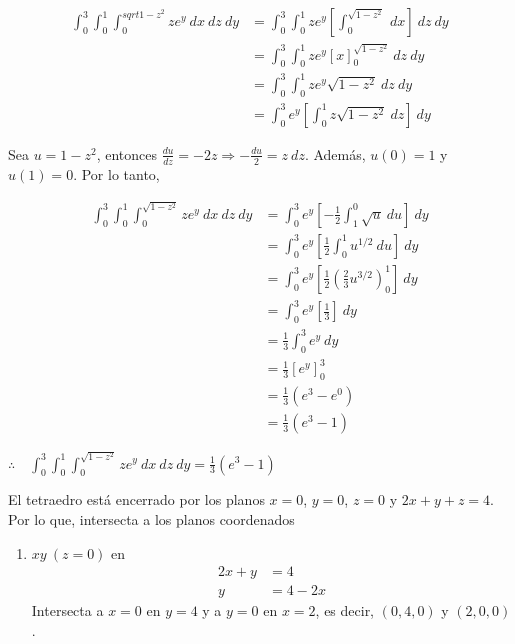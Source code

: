 \documentclass[12pt]{exam}
\begin{document}
\begin{questions}
\begin{enumerate}[(a)]
    \begin{align*}
      \int_0^3 \int_0^1 \int_0^{sqrt{1-z^2}} ze^y ~ dx ~ dz ~ dy
      &= \int_0^3 \int_0^1 ze^y \left[ \int_0^{\sqrt{1-z^2}} ~ dx \right] ~ dz ~ dy \\
      &= \int_0^3 \int_0^1 ze^y \left[ x \right]_0^{\sqrt{1-z^2}} ~ dz ~ dy \\
      &= \int_0^3 \int_0^1 ze^y \sqrt{1-z^2} ~ dz ~ dy \\
      &= \int_0^3 e^y \left[ \int_0^1 z \sqrt{1-z^2} ~ dz \right] ~ dy
    \end{align*}

    Sea $u=1-z^2$, entonces $\frac{du}{dz} = -2z \Rightarrow -\frac{du}{2} = z ~ dz$. Además,
    $u(0) = 1$ y $u(1) = 0$. Por lo tanto,

    \begin{align*}
      \int_0^3 \int_0^1 \int_0^{\sqrt{1-z^2}} ze^y ~ dx ~ dz ~ dy
      &= \int_0^3 e^y \left[ -\frac{1}{2} \int_1^0 \sqrt{u} ~ du \right] ~ dy \\
      &= \int_0^3 e^y \left[ \frac{1}{2} \int_0^1 u^{1/2} ~ du \right] ~ dy \\
      &= \int_0^3 e^y \left[ \frac{1}{2} \left( \frac{2}{3} u^{3/2} \right)_0^1 \right] ~ dy \\
      &= \int_0^3 e^y \left[ \frac{1}{3} \right] ~ dy \\
      &= \frac{1}{3} \int_0^3 e^y ~ dy \\
      &= \frac{1}{3} \left[ e^y \right]_0^3 \\
      &= \frac{1}{3} \left( e^3 - e^0 \right) \\
      &= \frac{1}{3} \left( e^3 - 1 \right)
    \end{align*}

    $\therefore \quad \int_0^3 \int_0^1 \int_0^{\sqrt{1-z^2}} ze^y ~ dx ~ dz ~ dy = \frac{1}{3} \left( e^3 - 1 \right)$
  \end{enumerate}


  El tetraedro está encerrado por los planos $x=0$, $y=0$, $z=0$ y $2x+y+z=4$. Por lo que, intersecta a los planos coordenados

  \begin{enumerate}
  \item $xy ~(z=0)$ en 
    \begin{align*}
      2x+y &= 4 \\
      y &= 4-2x
    \end{align*}
    Intersecta a $x=0$ en $y=4$ y a $y=0$ en $x=2$, es decir, $(0,4,0)$ y $(2,0,0)$.
    

\end{enumerate}
\end{questions}
\end{document}
